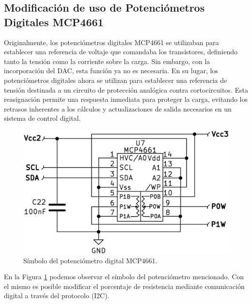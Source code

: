 \subsection{Modificación de uso de Potenciómetros Digitales MCP4661}
Originalmente, los potenciómetros digitales MCP4661 se utilizaban para establecer una referencia de voltaje que comandaba los transistores, definiendo tanto la tensión como la corriente sobre la carga. Sin embargo, con la incorporación del DAC, esta función ya no es necesaria. En su lugar, los potenciómetros digitales ahora se utilizan para establecer una referencia de tensión destinada a un circuito de protección analógica contra cortocircuitos. Esta reasignación permite una respuesta inmediata para proteger la carga, evitando los retrasos inherentes a los cálculos y actualizaciones de salida necesarios en un sistema de control digital.
\begin{figure}[H]
    \centering
    \includegraphics[scale=0.2]{./imagenes/potenciometro_digital.jpg}
    \caption{Símbolo del potenciómetro digital MCP4661.}
    \label{F:potenciometro_digital}
\end{figure}
En la Figura \ref{F:potenciometro_digital} podemos observar el símbolo del potenciómetro mencionado. Con el mismo es posible modificar el porcentaje de resistencia mediante comunicación digital a través del protocolo  (I2C).

